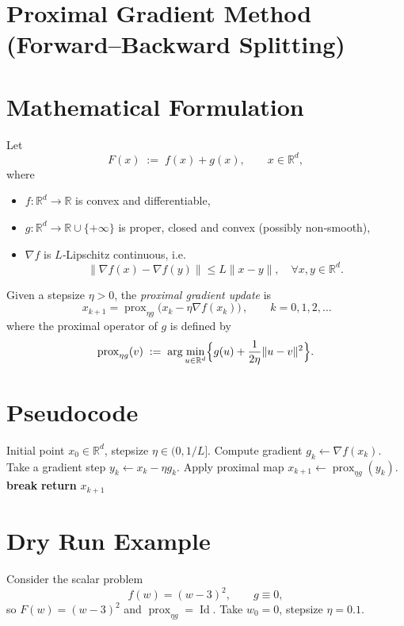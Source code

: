\documentclass{article}
\begin{document}
\section*{Proximal Gradient Method (Forward–Backward Splitting)}

\section*{Mathematical Formulation}
Let  
\[
F(x)\;:=\;f(x)+g(x),\qquad x\in\mathbb{R}^{d},
\]
where  

\begin{itemize}
\item $f:\mathbb{R}^{d}\rightarrow\mathbb{R}$ is convex and differentiable,
\item $g:\mathbb{R}^{d}\rightarrow\mathbb{R}\cup\{+\infty\}$ is proper, closed and convex (possibly non‑smooth),
\item $\nabla f$ is $L$‑Lipschitz continuous, i.e. 
\[
\|\nabla f(x)-\nabla f(y)\|\le L\|x-y\|,\quad\forall x,y\in\mathbb{R}^{d}.
\]
\end{itemize}

Given a stepsize $\eta>0$, the \emph{proximal gradient update} is  
\[
\boxed{\,x_{k+1}= \operatorname{prox}_{\eta g}\bigl(x_{k}-\eta\nabla f(x_{k})\bigr)\,},\qquad k=0,1,2,\dots
\]
where the proximal operator of $g$ is defined by  
\[
\operatorname{prox}_{\eta g}(v)\;:=\;\arg\min_{u\in\mathbb{R}^{d}}\Bigl\{g(u)+\frac{1}{2\eta}\|u-v\|^{2}\Bigr\}.
\]

\section*{Pseudocode}
\begin{algorithm}[H]
\caption{Proximal Gradient Method}
\begin{algorithmic}[1]
\Require Initial point $x_{0}\in\mathbb{R}^{d}$, stepsize $\eta\in(0,1/L]$.
    \State Compute gradient $g_{k}\gets\nabla f(x_{k})$.
    \State Take a gradient step $y_{k}\gets x_{k}-\eta g_{k}$.
    \State Apply proximal map $x_{k+1}\gets\operatorname{prox}_{\eta g}(y_{k})$.
        \State \textbf{break}
    \EndIf
\EndFor
\State \textbf{return} $x_{k+1}$
\end{algorithmic}
\end{algorithm}

\section*{Dry Run Example}
Consider the scalar problem  
\[
f(w)=(w-3)^{2},\qquad g\equiv 0,
\]
so $F(w)= (w-3)^{2}$ and $\operatorname{prox}_{\eta g}= \operatorname{Id}$.  
Take $w_{0}=0$, stepsize $\eta=0.1$.
\end{document}
